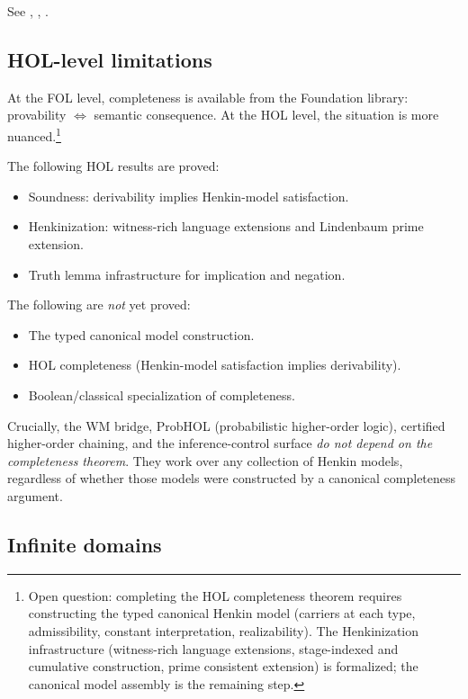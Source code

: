 \documentclass[11pt,openany]{report}
\begin{document}
See ,
,
.

\subsection{HOL-level limitations}

At the FOL level, completeness is available from the Foundation
library: provability $\Leftrightarrow$ semantic consequence.  At
the HOL level, the situation is more
nuanced.\footnote{Open question: completing the HOL
completeness theorem requires constructing the typed canonical
Henkin model (carriers at each type, admissibility, constant
interpretation, realizability).  The Henkinization infrastructure
(witness-rich language extensions, stage-indexed and cumulative
construction, prime consistent extension) is formalized; the
canonical model assembly is the remaining
step.}

The following HOL results are proved:
\begin{itemize}
\item Soundness: derivability implies Henkin-model satisfaction.
\item Henkinization: witness-rich language extensions and Lindenbaum
  prime extension.
\item Truth lemma infrastructure for implication and negation.
\end{itemize}

The following are \emph{not} yet proved:
\begin{itemize}
\item The typed canonical model construction.
\item HOL completeness (Henkin-model satisfaction implies
  derivability).
\item Boolean/classical specialization of completeness.
\end{itemize}

\noindent
Crucially, the WM bridge, ProbHOL (probabilistic higher-order logic),
certified higher-order chaining, and the inference-control surface
\emph{do not depend on the completeness theorem}.  They work over any
collection of Henkin models, regardless of whether those models were
constructed by a canonical completeness argument.

\subsection{Infinite domains}
\end{document}
